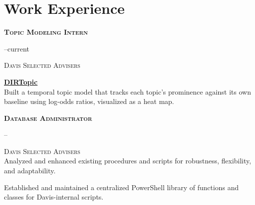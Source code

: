\section{Work Experience}

{\scshape{\bfseries{\textsf{Topic Modeling Intern}}}} \hfill
{}

\vspace{2ex}
\begin{minipage}[t]{0.195\textwidth}
    \vspace{-\topskip}
    {\footnotesize{\textsf{--current}}}\\
\end{minipage}
\hfill
\begin{minipage}[t]{0.8\textwidth}
    \vspace{-\topskip}
    {\scshape\textsf{Davis Selected Advisers}
    }\\
    \setlength{\parskip}{1em}

    \href{https://github.com/\github/dirtopic}{
        \bfseries\textsf{\footnotesize{DIRTopic}} \scalebox{.8}\faGithub
    }\\
    Built a temporal topic model that tracks each topic's prominence
    against its own baseline using log-odds ratios, visualized as a heat map.

\end{minipage}
\vspace{2ex}

{\scshape{\bfseries{\textsf{Database Administrator}}}} \hfill
    {}

\vspace{2ex}
\begin{minipage}[t]{0.195\textwidth}
    \vspace{-\topskip}
    {\footnotesize{\textsf{--}}}\\
\end{minipage}
\hfill
\begin{minipage}[t]{0.8\textwidth}
    \vspace{-\topskip}
    {\scshape\textsf{Davis Selected Advisers}
    }\\
    \setlength{\parskip}{1em}
    Analyzed and enhanced existing procedures and scripts for
    robustness, flexibility, and adaptability.

    Established and maintained a centralized PowerShell library of functions and
    classes for Davis-internal scripts.

\end{minipage}
\vspace{2ex}


